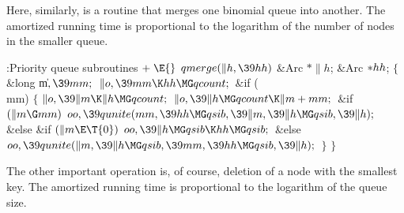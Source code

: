 Here, similarly, is a routine that merges one binomial queue into
another. The amortized running time is proportional to the logarithm
of the number of nodes in the smaller queue.

\Y\B\4:Priority queue subroutines\X${}\mathrel+\E{}$\6
\1\1${}\\{qmerge}(\|h,\39\\{hh}){}$\6
\&{Arc} ${}{*}\|h{}$;\6
\&{Arc} ${}{*}\\{hh}{}$;\2%
\2\6
${}\{{}$\5
\1\&{long} \|m${},\39\\{mm};{}$\7
${}\|o,\39\\{mm}\K\\{hh}\MG\\{qcount};{}$\6
\&{if} (\\{mm})\5
${}\{{}$\1\6
${}\|o,\39\|m\K\|h\MG\\{qcount};{}$\6
${}\|o,\39\|h\MG\\{qcount}\K\|m+\\{mm};{}$\6
\&{if} ${}(\|m\G\\{mm}){}$\1\5
${}\\{oo},\39\\{qunite}(\\{mm},\39\\{hh}\MG\\{qsib},\39\|m,\39\|h\MG\\{qsib},%
\39\|h);{}$\2\6
\&{else} \&{if} ${}(\|m\E\T{0}){}$\1\5
${}\\{oo},\39\|h\MG\\{qsib}\K\\{hh}\MG\\{qsib};{}$\2\6
\&{else}\1\5
${}\\{oo},\39\\{qunite}(\|m,\39\|h\MG\\{qsib},\39\\{mm},\39\\{hh}\MG\\{qsib},%
\39\|h);{}$\2\6
\4${}\}{}$\2\6
\4${}\}{}$\2\par
\fi

The other important operation is, of course, deletion of a node
with the smallest key. The amortized running time is proportional to
the logarithm of the queue size.

